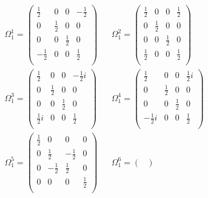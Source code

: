 \begin{align*}
    \Omega_{1}^{1} = 
    \begin{pmatrix}
    \frac{1}{2}  &  0  &  0  &  -\frac{1}{2}  \\
    0  &  \frac{1}{2}  &  0  &  0  \\
    0  &  0  &  \frac{1}{2}  &  0  \\
    -\frac{1}{2}  &  0  &  0  &  \frac{1}{2}  \\
    \end{pmatrix}
    &&
    \Omega_{1}^{2} = 
    \begin{pmatrix}
    \frac{1}{2}  &  0  &  0  &  \frac{1}{2}  \\
    0  &  \frac{1}{2}  &  0  &  0  \\
    0  &  0  &  \frac{1}{2}  &  0  \\
    \frac{1}{2}  &  0  &  0  &  \frac{1}{2}  \\
    \end{pmatrix}
    \\
    \Omega_{1}^{3} = 
    \begin{pmatrix}
    \frac{1}{2}  &  0  &  0  &  -\frac{1}{2}i  \\
    0  &  \frac{1}{2}  &  0  &  0  \\
    0  &  0  &  \frac{1}{2}  &  0  \\
    \frac{1}{2}i  &  0  &  0  &  \frac{1}{2}  \\
    \end{pmatrix}
    &&
    \Omega_{1}^{4} = 
    \begin{pmatrix}
    \frac{1}{2}  &  0  &  0  &  \frac{1}{2}i  \\
    0  &  \frac{1}{2}  &  0  &  0  \\
    0  &  0  &  \frac{1}{2}  &  0  \\
    -\frac{1}{2}i  &  0  &  0  &  \frac{1}{2}  \\
    \end{pmatrix}
    \\
    \Omega_{1}^{5} = 
    \begin{pmatrix}
    \frac{1}{2}  &  0  &  0  &  0  \\
    0  &  \frac{1}{2}  &  -\frac{1}{2}  &  0  \\
    0  &  -\frac{1}{2}  &  \frac{1}{2}  &  0  \\
    0  &  0  &  0  &  \frac{1}{2}  \\
    \end{pmatrix}
    &&
    \Omega_{1}^{6} = 
    \begin{pmatrix}

\end{pmatrix}
\end{align*}
